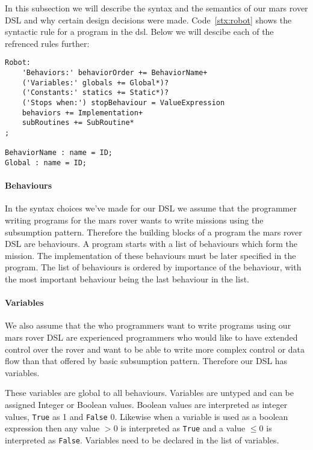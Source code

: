 In this subsection we will describe the syntax and the semantics of our mars
rover DSL and why certain design decisions were made. Code~\ref{stx:robot} shows
the syntactic rule for a program in the dsl. Below we will descibe each of the
refrenced rules further:

\begin{lstlisting}[caption=Main syntactic rule, label=stc:robot]
Robot:
    'Behaviors:' behaviorOrder += BehaviorName+
    ('Variables:' globals += Global*)?
    ('Constants:' statics += Static*)?
    ('Stops when:') stopBehaviour = ValueExpression
    behaviors += Implementation+
    subRoutines += SubRoutine*
;

BehaviorName : name = ID;
Global : name = ID;
\end{lstlisting}

\paragraph{Behaviours} In the syntax choices we've made for our DSL we assume 
that the programmer
writing programs for the mars rover wants to write missions using the 
subsumption pattern. Therefore the building blocks of a program the mars rover 
DSL are behaviours. A program starts with a list of behaviours which form the 
mission. The implementation of these behaviours must be later specified in the
program. The list of behaviours is ordered by importance of the behaviour, with
the most important behaviour being the last behaviour in the list. 

\paragraph{Variables} We also assume that the who programmers want to write 
programs using our mars
rover DSL are experienced programmers who would like to have extended control
over the rover and want to be able to write more complex control or data flow 
than that offered by basic subsumption pattern. Therefore our DSL has variables.

These variables are global to all behaviours. Variables are untyped and can be 
assigned Integer or Boolean values. Boolean values are interpreted as integer
values, \texttt{True} as 1 and \texttt{False} 0. Likewise when a variable is 
used as a boolean expression then any value $>0$ is interpreted as \texttt{True}
and a value $\leq 0$ is interpreted as \texttt{False}. Variables need to be 
declared in the list of variables.

